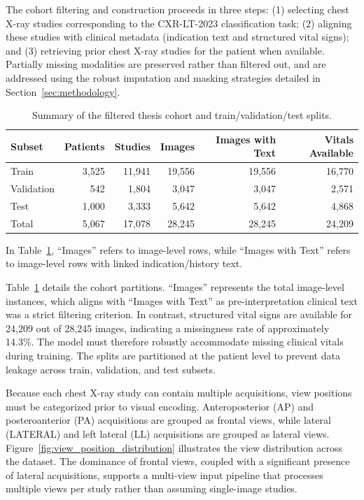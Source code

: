 The cohort filtering and construction proceeds in three steps: (1) selecting chest X-ray studies corresponding to the CXR-LT-2023 classification task; (2) aligning these studies with clinical metadata (indication text and structured vital signs); and (3) retrieving prior chest X-ray studies for the patient when available. Partially missing modalities are preserved rather than filtered out, and are addressed using the robust imputation and masking strategies detailed in Section~\ref{sec:methodology}.



\begin{table}[H]
    \centering
    \caption[Summary of the dataset cohort and splits.]{Summary of the filtered thesis cohort and train/validation/test splits.}
    \label{tab:cohort_summary}
    \begin{tabular}{lrrrrr}
        \hline
        Subset & Patients & Studies & Images & Images with Text & Vitals Available \\
        \hline
        Train & 3,525 & 11,941 & 19,556 & 19,556 & 16,770 \\
        Validation & 542 & 1,804 & 3,047 & 3,047 & 2,571 \\
        Test & 1,000 & 3,333 & 5,642 & 5,642 & 4,868 \\
        Total & 5,067 & 17,078 & 28,245 & 28,245 & 24,209 \\
        \hline
    \end{tabular}
\end{table}

In Table~\ref{tab:cohort_summary}, ``Images'' refers to image-level rows, while ``Images with Text'' refers to image-level rows with linked indication/history text.

Table~\ref{tab:cohort_summary} details the cohort partitions. ``Images'' represents the total image-level instances, which aligns with ``Images with Text'' as pre-interpretation clinical text was a strict filtering criterion. In contrast, structured vital signs are available for 24,209 out of 28,245 images, indicating a missingness rate of approximately 14.3\%. The model must therefore robustly accommodate missing clinical vitals during training. The splits are partitioned at the patient level to prevent data leakage across train, validation, and test subsets.

Because each chest X-ray study can contain multiple acquisitions, view positions must be categorized prior to visual encoding. Anteroposterior (AP) and posteroanterior (PA) acquisitions are grouped as frontal views, while lateral (LATERAL) and left lateral (LL) acquisitions are grouped as lateral views. Figure~\ref{fig:view_position_distribution} illustrates the view distribution across the dataset. The dominance of frontal views, coupled with a significant presence of lateral acquisitions, supports a multi-view input pipeline that processes multiple views per study rather than assuming single-image studies.

